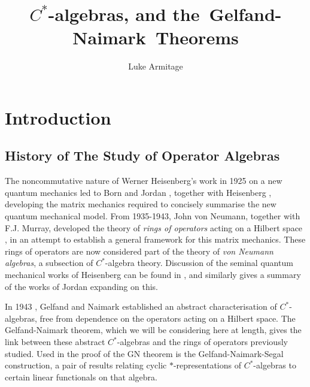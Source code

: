 \documentclass[12pt,a4paper]{report}
\author{Luke Armitage}
\title{$C^\ast$-algebras, and the~Gelfand-Naimark~Theorems}
\theoremstyle{plain}
\theoremstyle{definition}
\newcommand{\1}{\mathbbm{1}}
\begin{document}
\maketitle
\makeatletter  						%
    \providecommand\@dotsep{5}
  \makeatother
\listoftodos\relax
\newcommand\Item[1][]{ 				%
  \ifx\relax#1\relax  \item \else \item[#1] \fi
  \abovedisplayskip=0pt\abovedisplayshortskip=0pt~\vspace*{-\baselineskip}}
\tableofcontents

\chapter{Introduction}

\section{History of The Study of Operator Algebras}
	The noncommutative nature of Werner Heisenberg's work in 1925 on a new quantum mechanics \cite{heisenberg25} 
	led to Born and Jordan \cite{bornjordan25}, together with Heisenberg \cite{bornjordanheisenberg25}, 
	developing the matrix mechanics required to concisely summarise the new quantum mechanical model. 
	From 1935-1943, John von Neumann, together with F.J. Murray, developed the theory of \emph{rings of 
	operators} acting on a Hilbert space \cite{vonneumann35,vonneumann37,vonneumann43,vonneumann40}, in an 
	attempt to establish a general framework for this matrix mechanics.
	These rings of operators are now considered part of the theory of \emph{von Neumann algebras}, a 
	subsection of $C^\ast$-algebra theory. 
	Discussion of the seminal quantum mechanical works of Heisenberg can be found in \cite{mackinnon77}, and 
	similarly \cite{schroer03} gives a summary of the works of Jordan expanding on this.
	
	In 1943 \cite{gelfand43}, Gelfand and Naimark established an abstract characterisation of 
	$C^\ast$-algebras, free from dependence on the operators acting on a Hilbert space.
	The Gelfand-Naimark theorem, which we will be considering here at length, gives the link between these 
	abstract $C^\ast$-algebras and the rings of operators previously studied.
	Used in the proof of the GN theorem is the Gelfand-Naimark-Segal construction, a pair of results relating 
	cyclic $\ast$-representations of $C^\ast$-algebras to certain linear functionals on that algebra. 
	
\end{document}
